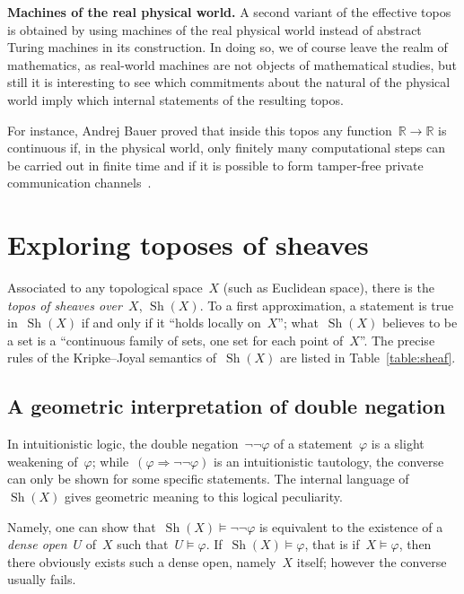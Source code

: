 \documentclass[oneside]{amsart}
\theoremstyle{definition}
\theoremstyle{plain}
\theoremstyle{remark}
\newcommand{\RR}{\mathbb{R}}
\DeclareMathOperator{\Sh}{Sh}
\renewcommand{\_}{\mathpunct{.}\,}
\newcommand{\effective}{ef{}fective\xspace}
\newcommand{\?}{\,{:}\,}
\renewcommand{\paragraph}[1]{\noindent\textbf{#1.}}
\begin{document}
\bigskip
\paragraph{Machines of the real physical world} A second variant of the
\effective topos is obtained by using machines of the real physical world
instead of abstract Turing machines in its construction. In doing so, we of
course leave the realm of mathematics, as real-world machines are not objects
of mathematical studies, but still it is interesting to see which commitments
about the natural of the physical world imply which internal statements of the
resulting topos.

For instance, Andrej Bauer proved that inside this topos any function~$\RR \to
\RR$ is continuous if, in the physical world, only finitely many computational
steps can be carried out in finite time and if it is possible to form
tamper-free private communication channels~\cite{bauer:int-mathematics}.


\section{Exploring toposes of sheaves}

Associated to any topological space~$X$ (such as Euclidean space), there is the
\emph{topos of sheaves over~$X$}, $\Sh(X)$. To a first approximation, a
statement is true in~$\Sh(X)$ if and only if it ``holds locally on~$X$'';
what~$\Sh(X)$ believes to be a set is a ``continuous family of sets, one set
for each point of~$X$''. The precise rules of the Kripke--Joyal semantics
of~$\Sh(X)$ are listed in Table~\ref{table:sheaf}.


\subsection{A geometric interpretation of double negation}
In intuitionistic logic, the double negation~$\neg\neg\varphi$ of a
statement~$\varphi$ is a slight weakening of~$\varphi$; while~$(\varphi
\Rightarrow \neg\neg\varphi)$ is an intuitionistic tautology, the converse can
only be shown for some specific statements. The internal language of~$\Sh(X)$
gives geometric meaning to this logical peculiarity.

Namely, one can show that~$\Sh(X) \models \neg\neg\varphi$ is equivalent to the
existence of a \emph{dense open}~$U$ of~$X$ such that~$U \models \varphi$.
If~$\Sh(X) \models \varphi$, that is if~$X \models \varphi$, then there
obviously exists such a dense open, namely~$X$ itself; however the converse
usually fails.
\end{document}

